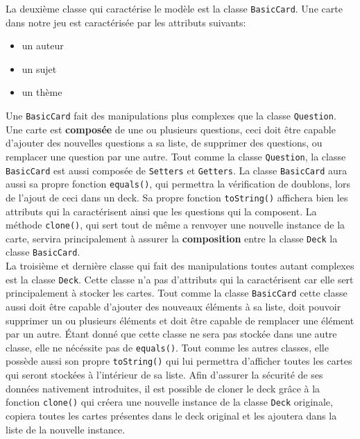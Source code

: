 La deuxième classe qui caractérise le modèle est la classe \verb|BasicCard|.
Une carte dans notre jeu est caractérisée par les attributs suivants:
\begin{itemize}
\item un auteur
\item un sujet
\item un thème
\end{itemize}
Une \verb|BasicCard| fait des manipulations plus complexes que la classe \verb|Question|.
Une carte est \textbf{composée} de une ou plusieurs questions, ceci doit être capable d'ajouter des nouvelles questions a sa liste, de supprimer des questions, ou remplacer une question par une autre.
Tout comme la classe \verb|Question|, la classe \verb|BasicCard| est aussi composée de \verb|Setters| et \verb|Getters|.
La classe \verb|BasicCard| aura aussi sa propre fonction \verb|equals()|, qui permettra la vérification de doublons, lors de l'ajout de ceci dans un deck.
Sa propre fonction \verb|toString()| affichera bien les attributs qui la caractérisent ainsi que les questions qui la composent.
La méthode \verb|clone()|, qui sert tout de même a renvoyer une nouvelle instance de la carte, servira principalement à assurer la \textbf{composition} entre la classe \verb|Deck| la classe \verb|BasicCard|.\\

La troisième et dernière classe qui fait des manipulations toutes autant complexes est la classe \verb|Deck|.
Cette classe n'a pas d'attributs qui la caractérisent car elle sert principalement à stocker les cartes.
Tout comme la classe \verb|BasicCard| cette classe aussi doit être capable d'ajouter des nouveaux éléments à sa liste, doit pouvoir supprimer un ou plusieurs éléments et doit être capable de remplacer une élément par un autre.
Étant donné que cette classe ne sera pas stockée dans une autre classe, elle ne nécéssite pas de \verb|equals()|.
Tout comme les autres classes, elle possède aussi son propre \verb|toString()| qui lui permettra d'afficher toutes les cartes qui seront stockées à l'intérieur de sa liste.
Afin d'assurer la sécurité de ses données nativement introduites, il est possible de cloner le deck grâce à la fonction \verb|clone()| qui créera une nouvelle instance de la classe \verb|Deck| originale, copiera toutes les cartes présentes dans le deck original et les ajoutera dans la liste de la nouvelle instance.

\newpage
